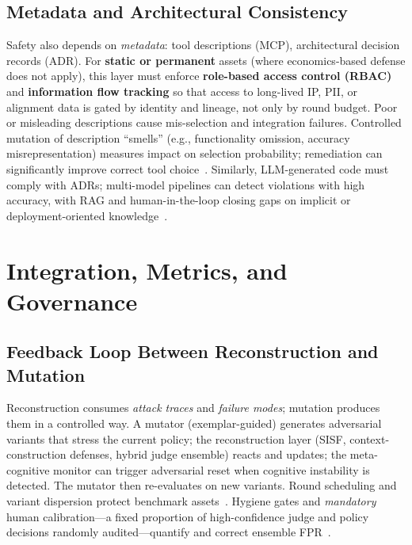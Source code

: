 \documentclass[letterpaper,twocolumn,10pt]{article}
\begin{document}
\subsection{Metadata and Architectural Consistency}
\label{sec:metadata}

Safety also depends on \emph{metadata}: tool descriptions (MCP), architectural decision records (ADR). For \textbf{static or permanent} assets (where economics-based defense does not apply), this layer must enforce \textbf{role-based access control (RBAC)} and \textbf{information flow tracking} so that access to long-lived IP, PII, or alignment data is gated by identity and lineage, not only by round budget. Poor or misleading descriptions cause mis-selection and integration failures. Controlled mutation of description ``smells'' (e.g., functionality omission, accuracy misrepresentation) measures impact on selection probability; remediation can significantly improve correct tool choice~\cite{mcp-smell-arxiv}. Similarly, LLM-generated code must comply with ADRs; multi-model pipelines can detect violations with high accuracy, with RAG and human-in-the-loop closing gaps on implicit or deployment-oriented knowledge~\cite{adr-violation,mission-critical-rag}.

\section{Integration, Metrics, and Governance}
\label{sec:integration}

\subsection{Feedback Loop Between Reconstruction and Mutation}

Reconstruction consumes \emph{attack traces} and \emph{failure modes}; mutation produces them in a controlled way. A mutator (exemplar-guided) generates adversarial variants that stress the current policy; the reconstruction layer (SISF, context-construction defenses, hybrid judge ensemble) reacts and updates; the meta-cognitive monitor can trigger adversarial reset when cognitive instability is detected. The mutator then re-evaluates on new variants. Round scheduling and variant dispersion protect benchmark assets~\cite{ControlledMutation_SafetyEval}. Hygiene gates and \emph{mandatory} human calibration---a fixed proportion of high-confidence judge and policy decisions randomly audited---quantify and correct ensemble FPR~\cite{tc260-governance}.
\end{document}
